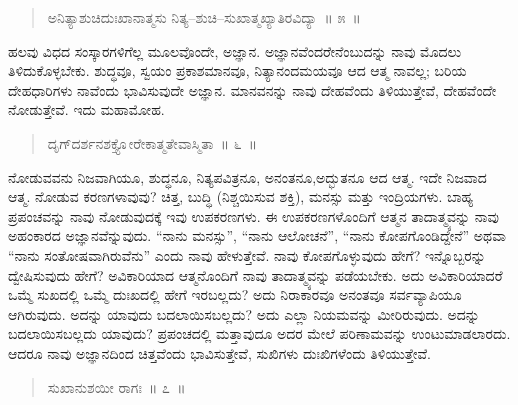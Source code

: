 \vspace{-0.2cm}

\begin{verse}
ಅನಿತ್ಯಾಶುಚಿದುಃಖಾನಾತ್ಮಸು ನಿತ್ಯ–ಶುಚಿ–ಸುಖಾತ್ಮಖ್ಯಾತಿರವಿದ್ಯಾ~॥ ೫~॥
\end{verse}

\vspace{-0.4cm}


\vskip 0.2cm

ಹಲವು ವಿಧದ ಸಂಸ್ಕಾರಗಳಿಗೆಲ್ಲ ಮೂಲವೊಂದೇ, ಅಜ್ಞಾನ. ಅಜ್ಞಾನವೆಂದರೇನೆಂಬು\break ದನ್ನು ನಾವು ಮೊದಲು ತಿಳಿದುಕೊಳ್ಳಬೇಕು. ಶುದ್ಧವೂ, ಸ್ವಯಂ ಪ್ರಕಾಶಮಾನವೂ, ನಿತ್ಯಾನಂದಮಯವೂ ಆದ ಆತ್ಮ ನಾವಲ್ಲ; ಬರಿಯ ದೇಹಧಾರಿಗಳು ನಾವೆಂದು ಭಾವಿಸುವುದೇ ಅಜ್ಞಾನ. ಮಾನವನನ್ನು ನಾವು ದೇಹವೆಂದು ತಿಳಿಯುತ್ತೇವೆ, ದೇಹವೆಂದೇ ನೋಡುತ್ತೇವೆ. ಇದು ಮಹಾಮೋಹ. 

\vspace{-0.2cm}

\begin{verse}
ದೃಗ್​ದರ್ಶನಶಕ್ತ್ಯೋರೇಕಾತ್ಮತೇವಾಸ್ಮಿತಾ~॥ ೬~॥
\end{verse}

\vspace{-0.4cm}


\vskip 0.2cm

ನೋಡುವವನು ನಿಜವಾಗಿಯೂ, ಶುದ್ಧನೂ, ನಿತ್ಯಪವಿತ್ರನೂ, ಅನಂತನೂ,\break ಅದ್ಭುತನೂ ಆದ ಆತ್ಮ. ಇದೇ ನಿಜವಾದ ಆತ್ಮ. ನೋಡುವ ಕರಣಗಳಾವುವು? ಚಿತ್ತ, ಬುದ್ಧಿ (ನಿಶ್ಚಯಿಸುವ ಶಕ್ತಿ), ಮನಸ್ಸು ಮತ್ತು ಇಂದ್ರಿಯಗಳು. ಬಾಹ್ಯ ಪ್ರಪಂಚವನ್ನು ನಾವು ನೋಡುವುದಕ್ಕೆ ಇವು ಉಪಕರಣಗಳು. ಈ ಉಪಕರಣಗಳೊಂದಿಗೆ ಆತ್ಮನ ತಾದಾತ್ಮ್ಯವನ್ನು ನಾವು ಅಹಂಕಾರದ ಅಜ್ಞಾನವೆನ್ನುವುದು. “ನಾನು ಮನಸ್ಸು”, “ನಾನು ಆಲೋಚನೆ”, “ನಾನು ಕೋಪಗೊಂಡಿದ್ದೇನೆ” ಅಥವಾ “ನಾನು ಸಂತೋಷವಾಗಿರುವೆನು” ಎಂದು ನಾವು ಹೇಳುತ್ತೇವೆ. ನಾವು ಕೋಪಗೊಳ್ಳುವುದು ಹೇಗೆ? ಇನ್ನೊಬ್ಬರನ್ನು ದ್ವೇಷಿಸುವುದು ಹೇಗೆ? ಅವಿಕಾರಿಯಾದ ಆತ್ಮನೊಂದಿಗೆ ನಾವು ತಾದಾತ್ಮ್ಯವನ್ನು ಪಡೆಯಬೇಕು. ಅದು ಅವಿಕಾರಿಯಾದರೆ ಒಮ್ಮೆ ಸುಖದಲ್ಲಿ ಒಮ್ಮೆ ದುಃಖದಲ್ಲಿ ಹೇಗೆ ಇರಬಲ್ಲದು? ಅದು ನಿರಾಕಾರವೂ ಅನಂತವೂ ಸರ್ವವ್ಯಾಪಿಯೂ ಆಗಿರುವುದು. ಅದನ್ನು ಯಾವುದು ಬದಲಾಯಿಸಬಲ್ಲದು? ಅದು ಎಲ್ಲಾ ನಿಯಮವನ್ನು ಮೀರಿರುವುದು. ಅದನ್ನು ಬದಲಾಯಿಸಬಲ್ಲದು ಯಾವುದು? ಪ್ರಪಂಚದಲ್ಲಿ ಮತ್ತಾವುದೂ ಅದರ ಮೇಲೆ ಪರಿಣಾಮವನ್ನು ಉಂಟುಮಾಡಲಾರದು. ಆದರೂ ನಾವು ಅಜ್ಞಾನದಿಂದ ಚಿತ್ತವೆಂದು ಭಾವಿಸುತ್ತೇವೆ, ಸುಖಿಗಳು ದುಃಖಿಗಳೆಂದು ತಿಳಿಯುತ್ತೇವೆ. 

\vspace{-0.2cm}

\begin{verse}
ಸುಖಾನುಶಯೀ ರಾಗಃ~॥ ೭~॥
\end{verse}

